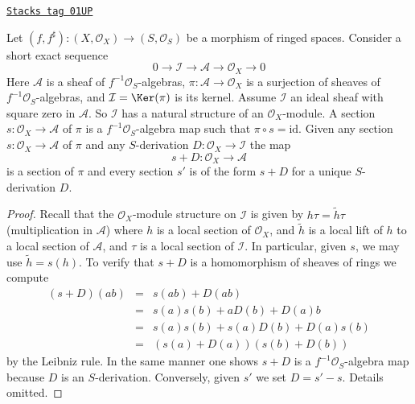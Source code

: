 \begin{lemma}
\label{modules-lemma-double-structure-gives-derivation}
\href{https://stacks.math.columbia.edu/tag/01UP}{\texttt{Stacks tag 01UP}}

Let $(f, f^\sharp) : (X, \mathcal{O}_X) \to (S, \mathcal{O}_S)$
be a morphism of ringed spaces. Consider a short exact sequence
$$
0 \to \mathcal{I} \to \mathcal{A} \to \mathcal{O}_X \to 0
$$
Here $\mathcal{A}$ is a sheaf of $f^{-1}\mathcal{O}_S$-algebras,
$\pi : \mathcal{A} \to \mathcal{O}_X$ is a surjection
of sheaves of $f^{-1}\mathcal{O}_S$-algebras, and
$\mathcal{I} = \Ker(\pi)$ is its kernel. Assume $\mathcal{I}$ an ideal
sheaf with square zero in $\mathcal{A}$. So $\mathcal{I}$
has a natural structure of an $\mathcal{O}_X$-module.
A section $s : \mathcal{O}_X \to \mathcal{A}$ of $\pi$
is a $f^{-1}\mathcal{O}_S$-algebra map such that $\pi \circ s = \text{id}$.
Given any section $s : \mathcal{O}_X \to \mathcal{A}$
of $\pi$ and any $S$-derivation $D : \mathcal{O}_X \to \mathcal{I}$
the map
$$
s + D : \mathcal{O}_X \to \mathcal{A}
$$
is a section of $\pi$ and every section $s'$ is of the form $s + D$
for a unique $S$-derivation $D$.
\end{lemma}

\begin{proof}
Recall that the $\mathcal{O}_X$-module structure on $\mathcal{I}$
is given by $h \tau = \tilde h \tau$ (multiplication in $\mathcal{A}$)
where $h$ is a local section of $\mathcal{O}_X$, and
$\tilde h$ is a local lift of $h$ to a local
section of $\mathcal{A}$, and $\tau$ is a local section of $\mathcal{I}$.
In particular, given $s$, we may use $\tilde h = s(h)$.
To verify that $s + D$ is a homomorphism of sheaves of rings we
compute
\begin{eqnarray*}
(s + D)(ab) & = & s(ab) + D(ab) \\
& = & s(a)s(b) + aD(b) + D(a)b \\
& = & s(a) s(b) + s(a)D(b) + D(a)s(b) \\
& = & (s(a) + D(a))(s(b) + D(b))
\end{eqnarray*}
by the Leibniz rule. In the same manner one shows
$s + D$ is a $f^{-1}\mathcal{O}_S$-algebra
map because $D$ is an $S$-derivation. Conversely, given $s'$ we set
$D = s' - s$. Details omitted.
\end{proof}

